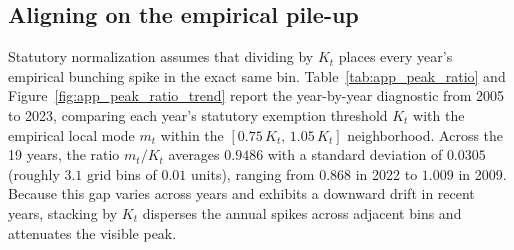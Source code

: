 \subsection{Aligning on the empirical pile-up}

Statutory normalization assumes that dividing by $K_t$ places every year's empirical bunching spike in the exact same bin. Table~\ref{tab:app_peak_ratio} and Figure~\ref{fig:app_peak_ratio_trend} report the year-by-year diagnostic from 2005 to 2023, comparing each year's statutory exemption threshold $K_t$ with the empirical local mode $m_t$ within the $[0.75\,K_t,\, 1.05\,K_t]$ neighborhood. Across the 19 years, the ratio $m_t / K_t$ averages $0.9486$ with a standard deviation of $0.0305$ (roughly $3.1$ grid bins of $0.01$ units), ranging from $0.868$ in 2022 to $1.009$ in 2009. Because this gap varies across years and exhibits a downward drift in recent years, stacking by $K_t$ disperses the annual spikes across adjacent bins and attenuates the visible peak.

